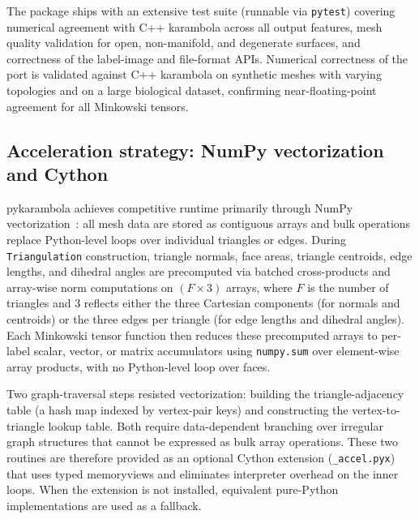 \documentclass[times, twoside, watermark]{zHenriquesLab-StyleBioRxiv}
\newcommand{\replaced}[3][]{#2}     %
\begin{document}
The package ships with an extensive test suite (runnable via \texttt{pytest}) covering numerical agreement with C++ karambola across all output features, mesh quality validation for open, non-manifold, and degenerate surfaces, and correctness of the label-image and file-format APIs.
\replaced{Numerical correctness of the port is validated against C++ karambola on synthetic meshes with varying topologies and on a large biological dataset, confirming near-floating-point agreement for all Minkowski tensors.}{Numerical correctness of the port was further validated by extensive benchmarking against the C++ karambola binary across a diverse set of test meshes, confirming near-floating-point agreement for all Minkowski scalars, vectors, and tensors.}

\subsection*{Acceleration strategy: NumPy vectorization and Cython}
pykarambola achieves competitive runtime primarily through NumPy vectorization~\cite{harris2020numpy}: all mesh data are stored as contiguous arrays and bulk operations replace Python-level loops over individual triangles or edges.
During \texttt{Triangulation} construction, triangle normals, face areas, triangle centroids, edge lengths, and dihedral angles are precomputed via batched cross-products and array-wise norm computations on $(F \times 3)$ arrays, where $F$ is the number of triangles and 3 reflects either the three Cartesian components (for normals and centroids) or the three edges per triangle (for edge lengths and dihedral angles).
Each Minkowski tensor function then reduces these precomputed arrays to per-label scalar, vector, or matrix accumulators using \texttt{numpy.sum} over element-wise array products, with no Python-level loop over faces.

Two graph-traversal steps resisted vectorization: building the triangle-adjacency table (a hash map indexed by vertex-pair keys) and constructing the vertex-to-triangle lookup table.
Both require data-dependent branching over irregular graph structures that cannot be expressed as bulk array operations.
These two routines are therefore provided as an optional Cython extension (\texttt{\_accel.pyx}) that uses typed memoryviews and eliminates interpreter overhead on the inner loops.
When the extension is not installed, equivalent pure-Python implementations are used as a fallback.
\end{document}
